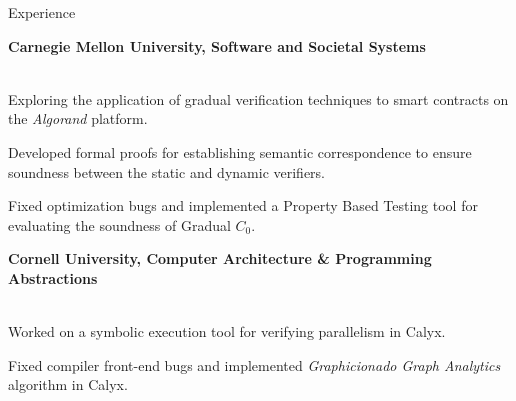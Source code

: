 \begin{rSection}{Experience}

	{\textbf{\large{Carnegie Mellon University, Software and Societal Systems}} \hfill \color{darkgray}{06/2022 - Present} 
	\\ \vspace*{2mm}
	 \hfill \color{darkgray}{Pittsburgh, PA} 
	\\ 
	\color{black}
	\begin{minipage}{40em}
		\color{black}Exploring the application of gradual verification techniques to smart contracts on the \textit{Algorand} platform.

		\color{black}Developed formal proofs for establishing semantic correspondence to ensure soundness between the static and dynamic verifiers.

		\color{black}Fixed optimization bugs and implemented a Property Based Testing tool for evaluating the soundness of Gradual $C_0$.
	\end{minipage}}
	
	\vspace*{2mm}

	{\textbf{\large{Cornell University, Computer Architecture \& Programming Abstractions}} \hfill \color{darkgray}{10/2021 - 12/2022} 
	\\ \vspace*{2mm}
	 \hfill \color{darkgray}{Ithaca, NY}
	\\
	\color{black}
	\begin{minipage}{40em}
		\color{black} Worked on a symbolic execution tool for verifying parallelism in Calyx.

		\color{black} Fixed compiler front-end bugs and implemented \textit{Graphicionado Graph Analytics} algorithm in Calyx.
	\end{minipage}} 

	\vspace*{2mm}

\end{rSection} 
